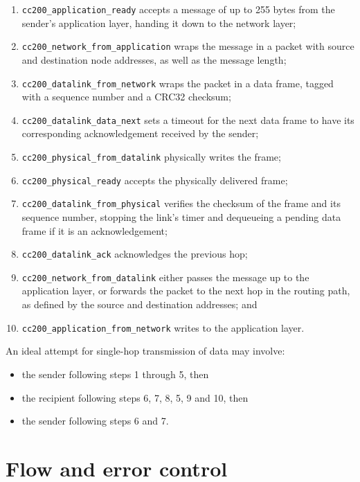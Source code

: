 \documentclass[a4paper,12pt,titlepage]{article}
\begin{document}
\begin{enumerate}
	\item \texttt{cc200\_application\_ready} accepts a message of up to 255
	      bytes from the sender's application layer, handing it down to
	      the network layer;
	\item \texttt{cc200\_network\_from\_application} wraps the message in
	      a packet with source and destination node addresses, as well as
	      the message length;
	\item \texttt{cc200\_datalink\_from\_network} wraps the packet in a
	      data frame, tagged with a sequence number and a CRC32 checksum;
	\item \texttt{cc200\_datalink\_data\_next} sets a timeout for the next
	      data frame to have its corresponding acknowledgement received by
	      the sender;
	\item \texttt{cc200\_physical\_from\_datalink} physically writes the
	      frame;
	\item \texttt{cc200\_physical\_ready} accepts the physically delivered
	      frame;
	\item \texttt{cc200\_datalink\_from\_physical} verifies the checksum of
	      the frame and its sequence number, stopping the link's timer and
	      dequeueing a pending data frame if it is an acknowledgement;
	\item \texttt{cc200\_datalink\_ack} acknowledges the previous hop;
	\item \texttt{cc200\_network\_from\_datalink} either passes the message
	      up to the application layer, or forwards the packet to the next
	      hop in the routing path, as defined by the source and destination
	      addresses; and
	\item \texttt{cc200\_application\_from\_network} writes to the
	      application layer.
\end{enumerate}

An ideal attempt for single-hop transmission of data may involve:

\begin{itemize}
	\item the sender following steps 1 through 5, then
	\item the recipient following steps 6, 7, 8, 5, 9 and 10, then
	\item the sender following steps 6 and 7.
\end{itemize}

\section{Flow and error control}
\end{document}
